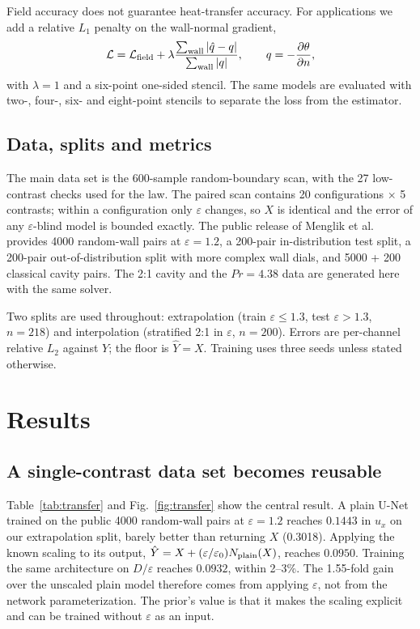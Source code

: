 \documentclass[preprint,11pt,a4paper,times,doubleblind]{elsarticle}
\begin{document}
Field accuracy does not guarantee heat-transfer accuracy. For applications we add a relative
$L_1$ penalty on the wall-normal gradient,
\begin{equation}
  \mathcal L=\mathcal L_{\rm field}
  +\lambda\frac{\sum_{\rm wall}|\hat q-q|}{\sum_{\rm wall}|q|},
  \qquad q=-\frac{\partial\theta}{\partial n},
  \label{eq:fluxloss}
\end{equation}
with $\lambda=1$ and a six-point one-sided stencil. The same models are evaluated with two-,
four-, six- and eight-point stencils to separate the loss from the estimator.

\subsection{Data, splits and metrics}

The main data set is the 600-sample random-boundary scan, with the 27 low-contrast checks used
for the law. The paired scan contains 20 configurations $\times$ 5 contrasts; within a
configuration only $\varepsilon$ changes, so $X$ is identical and the error of any
$\varepsilon$-blind model is bounded exactly. The public release of Menglik et al.
\label{sec:public}
\citep{menglik2026neural}
provides 4000 random-wall pairs at $\varepsilon=1.2$, a 200-pair in-distribution test split,
a 200-pair out-of-distribution split with more complex wall dials, and 5000 + 200 classical
cavity pairs. The 2:1 cavity and the $Pr=4.38$ data are generated here with the same solver.

Two splits are used throughout: extrapolation (train $\varepsilon\le1.3$, test
$\varepsilon>1.3$, $n=218$) and interpolation (stratified 2:1 in $\varepsilon$, $n=200$).
Errors are per-channel relative $L_2$ against $Y$; the floor is $\hat Y=X$. Training uses
three seeds unless stated otherwise.

\section{Results}
\label{sec:results}

\subsection{A single-contrast data set becomes reusable}
\label{sec:transfer}
\label{sec:reuse}

Table~\ref{tab:transfer} and Fig.~\ref{fig:transfer} show the central result. A plain U-Net
trained on the public 4000 random-wall pairs at $\varepsilon=1.2$ reaches $0.1443$ in $u_x$ on
our extrapolation split, barely better than returning $X$ (0.3018). Applying the known
scaling to its output, $\hat Y=X+(\varepsilon/\varepsilon_0)N_{\rm plain}(X)$, reaches
$0.0950$. Training the same architecture on $D/\varepsilon$ reaches $0.0932$, within 2--3\%.
The 1.55-fold gain over the unscaled plain model therefore comes from applying $\varepsilon$,
not from the network parameterization. The prior's value is that it makes the scaling explicit
and can be trained without $\varepsilon$ as an input.
\end{document}
